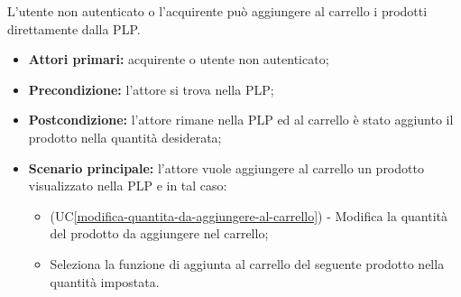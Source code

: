 L'utente non autenticato o l'acquirente può aggiungere al carrello i prodotti direttamente dalla PLP.
\begin{itemize}
    \item \textbf{Attori primari:} acquirente o utente non autenticato;
    \item \textbf{Precondizione:} l'attore si trova nella PLP;
    \item \textbf{Postcondizione:} l'attore rimane nella PLP ed al carrello è stato aggiunto il prodotto nella quantità desiderata;
    \item \textbf{Scenario principale:} l'attore vuole aggiungere al carrello un prodotto visualizzato nella PLP e in tal caso:
    \begin{itemize}
        \item (UC\ref{modifica-quantita-da-aggiungere-al-carrello}) - Modifica la quantità del prodotto da aggiungere nel carrello;
        \item Seleziona la funzione di aggiunta al carrello del seguente prodotto nella quantità impostata.
    \end{itemize}
\end{itemize}